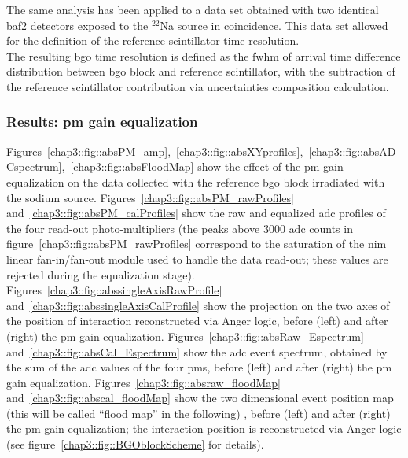 The same analysis has been applied to a data set obtained with two identical \gls{baf2} detectors exposed to the $^{22}$Na source in coincidence. This data set allowed for the definition of the reference scintillator time resolution.\\
The resulting \gls{bgo} time resolution is defined as the \gls{fwhm} of arrival time difference distribution between \gls{bgo} block and reference scintillator, with the subtraction of the reference scintillator contribution via uncertainties composition calculation.\\


\subsubsection{Results: \gls{pm} gain equalization}\label{chap3::subsubsec::absPMgainCal}
Figures~\ref{chap3::fig::absPM_amp},~\ref{chap3::fig::absXYprofiles},~\ref{chap3::fig::absADCspectrum},~\ref{chap3::fig::absFloodMap} show the effect of the \gls{pm} gain equalization on the data collected with the reference \gls{bgo} block irradiated with the sodium source.
Figures~\ref{chap3::fig::absPM_rawProfiles} and~\ref{chap3::fig::absPM_calProfiles} show the raw and equalized \gls{adc} profiles of the four read-out photo-multipliers (the peaks above 3000 \gls{adc} counts in figure~\ref{chap3::fig::absPM_rawProfiles} correspond to the saturation of the \gls{nim} linear fan-in/fan-out module used to handle the data read-out; these values are rejected during the equalization stage).
Figures~\ref{chap3::fig::abssingleAxisRawProfile} and~\ref{chap3::fig::abssingleAxisCalProfile} show the projection on the two axes of the position of interaction reconstructed via Anger logic, before (left) and after (right) the \gls{pm} gain equalization.
Figures~\ref{chap3::fig::absRaw_Espectrum} and~\ref{chap3::fig::absCal_Espectrum} show the \gls{adc} event spectrum, obtained by the sum of the \gls{adc} values of the four \glspl{pm}, before (left) and after (right) the \gls{pm} gain equalization.
Figures~\ref{chap3::fig::absraw_floodMap} and~\ref{chap3::fig::abscal_floodMap} show the two dimensional event position map (this will be called \enquote{flood map} in the following) , before (left) and after (right) the \gls{pm} gain equalization; the interaction position is reconstructed via Anger logic (see figure~\ref{chap3::fig::BGOblockScheme} for details).

